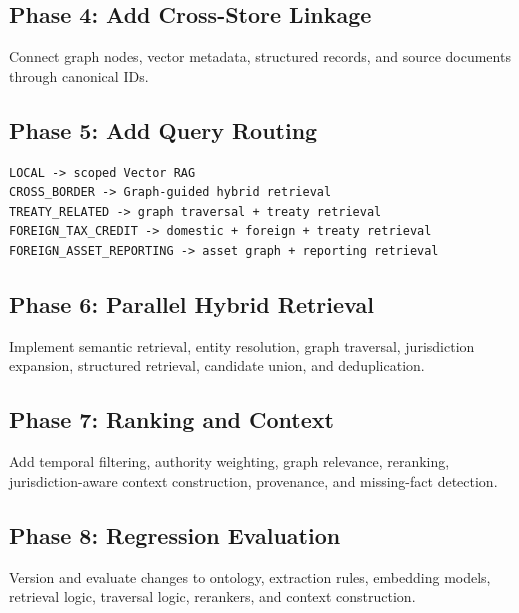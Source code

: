\documentclass[11pt,a4paper]{article}
\begin{document}
\subsection{Phase 4: Add Cross-Store Linkage}
Connect graph nodes, vector metadata, structured records, and source documents through canonical IDs.

\subsection{Phase 5: Add Query Routing}
\begin{lstlisting}
LOCAL -> scoped Vector RAG
CROSS_BORDER -> Graph-guided hybrid retrieval
TREATY_RELATED -> graph traversal + treaty retrieval
FOREIGN_TAX_CREDIT -> domestic + foreign + treaty retrieval
FOREIGN_ASSET_REPORTING -> asset graph + reporting retrieval
\end{lstlisting}

\subsection{Phase 6: Parallel Hybrid Retrieval}
Implement semantic retrieval, entity resolution, graph traversal, jurisdiction expansion, structured retrieval, candidate union, and deduplication.

\subsection{Phase 7: Ranking and Context}
Add temporal filtering, authority weighting, graph relevance, reranking, jurisdiction-aware context construction, provenance, and missing-fact detection.

\subsection{Phase 8: Regression Evaluation}
Version and evaluate changes to ontology, extraction rules, embedding models, retrieval logic, traversal logic, rerankers, and context construction.
\end{document}
